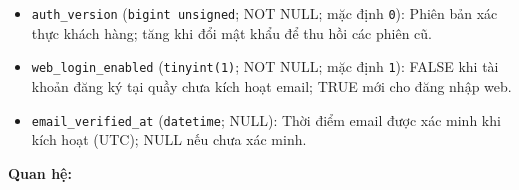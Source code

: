 \begin{itemize}
\item \texttt{auth\_version} (\texttt{bigint unsigned}; NOT NULL; mặc định \texttt{0}): Phiên bản xác thực khách hàng; tăng khi đổi mật khẩu để thu hồi các phiên cũ.

\item \texttt{web\_login\_enabled} (\texttt{tinyint(1)}; NOT NULL; mặc định \texttt{1}): FALSE khi tài khoản đăng ký tại quầy chưa kích hoạt email; TRUE mới cho đăng nhập web.

\item \texttt{email\_verified\_at} (\texttt{datetime}; NULL): Thời điểm email được xác minh khi kích hoạt (UTC); NULL nếu chưa xác minh.

\end{itemize}

\textbf{Quan hệ:}

